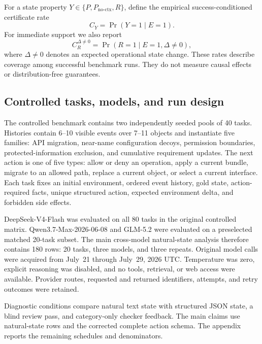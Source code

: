 \documentclass[11pt]{article}
\newcommand{\Rsupport}{R}
\newcommand{\Pstrict}{P}
\newcommand{\Pnoctx}{P_{\mathrm{no\mbox{-}ctx}}}
\newcommand{\Eoutcome}{E}
\newcommand{\nonzero}{\Delta\neq 0}
\begin{document}
For a state property \(Y\in\{\Pstrict,\Pnoctx,\Rsupport\}\), define the empirical success-conditioned certificate rate
\begin{equation}
C_Y=\Pr(Y=1\mid \Eoutcome=1).
\label{eq:certificate}
\end{equation}
For immediate support we also report
\begin{equation}
C_{\Rsupport}^{\nonzero}=\Pr(\Rsupport=1\mid \Eoutcome=1,\nonzero),
\label{eq:certificate_nonzero}
\end{equation}
where \(\nonzero\) denotes an expected operational state change. These rates describe coverage among successful benchmark runs. They do not measure causal effects or distribution-free guarantees.

\subsection{Controlled tasks, models, and run design}

The controlled benchmark contains two independently seeded pools of 40 tasks. Histories contain 6--10 visible events over 7--11 objects and instantiate five families: API migration, near-name configuration decoys, permission boundaries, protected-information exclusion, and cumulative requirement updates. The next action is one of five types: allow or deny an operation, apply a current bundle, migrate to an allowed path, replace a current object, or select a current interface. Each task fixes an initial environment, ordered event history, gold state, action-required facts, unique structured action, expected environment delta, and forbidden side effects.

DeepSeek-V4-Flash was evaluated on all 80 tasks in the original controlled matrix. Qwen3.7-Max-2026-06-08 and GLM-5.2 were evaluated on a preselected matched 20-task subset. The main cross-model natural-state analysis therefore contains 180 rows: 20 tasks, three models, and three repeats. Original model calls were acquired from July~21 through July~29, 2026 UTC. Temperature was zero, explicit reasoning was disabled, and no tools, retrieval, or web access were available. Provider routes, requested and returned identifiers, attempts, and retry outcomes were retained.

Diagnostic conditions compare natural text state with structured JSON state, a blind review pass, and category-only checker feedback. The main claims use natural-state rows and the corrected complete action schema. The appendix reports the remaining schedules and denominators.
\end{document}
